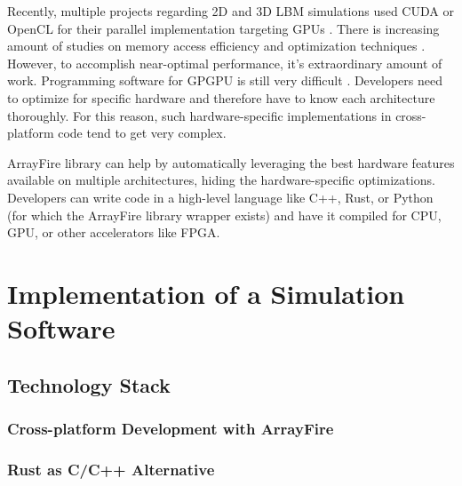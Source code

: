 Recently, multiple projects regarding 2D and 3D LBM simulations used CUDA or OpenCL for their parallel implementation targeting GPUs \cite{delboscRealTimeSimulationIndoor, delboscOptimizedImplementationLattice2014,  januszewskiSailfishFlexibleMultiGPU2014, FULLGPUImplementation2017, kotsalosDigitalBloodMassively2019, kolihaOnlineVisualizationInteractive2015, szokePerformanceEvaluationTwoDimensional2017, harwoodLUMAManycoreFluid2018, harwoodParallelisationInteractiveLatticeBoltzmann2017}. There is increasing amount of studies on memory access efficiency and optimization techniques \cite{herschlagGPUDataAccess2018, tranPerformanceOptimization3D2017}. However, to accomplish near-optimal performance, it's extraordinary amount of work. Programming software for GPGPU is still very difficult \cite{malcolmArrayFireGPUAcceleration2012}. Developers need to optimize for specific hardware and therefore have to know each architecture thoroughly. For this reason, such hardware-specific implementations in cross-platform code tend to get very complex.

ArrayFire library can help by automatically leveraging the best hardware features available on multiple architectures, hiding the hardware-specific optimizations. Developers can write code in a high-level language like C++, Rust, or Python (for which the ArrayFire library wrapper exists) and have it compiled for CPU, GPU, or other accelerators like FPGA.


\section{Implementation of a Simulation Software} 

\subsection{Technology Stack}

\subsubsection{Cross-platform Development with ArrayFire}

\subsubsection{Rust as C/C++ Alternative}

